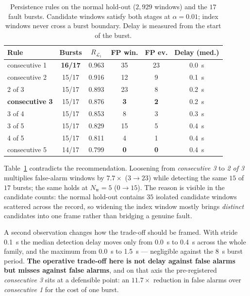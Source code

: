 \documentclass{article}
\begin{document}
\begin{table}[t]
\centering\small
\caption{Persistence rules on the normal hold-out ($2{,}929$ windows) and the
$17$ fault bursts. Candidate windows satisfy both stages at $\alpha=0.01$;
index windows never cross a burst boundary. Delay is measured from the start of
the burst.}
\label{tab:mofn}
\begin{tabular}{lccccc}
\toprule
Rule & Bursts & $R_{\mathcal{L}_1}$ & FP win. & FP ev. & Delay (med.) \\
\midrule
consecutive 1 & \textbf{16/17} & 0.963 & 35 & 23 & \SI{0.0}{\second} \\
consecutive 2 & 15/17 & 0.916 & 12 & 9 & \SI{0.1}{\second} \\
2 of 3        & 15/17 & 0.893 & 23 & 8 & \SI{0.2}{\second} \\
\textbf{consecutive 3} & 15/17 & 0.876 & \textbf{3} & \textbf{2} & \SI{0.2}{\second} \\
3 of 4        & 15/17 & 0.853 & 8  & 3 & \SI{0.3}{\second} \\
3 of 5        & 15/17 & 0.829 & 15 & 5 & \SI{0.4}{\second} \\
4 of 5        & 15/17 & 0.811 & 4  & 1 & \SI{0.4}{\second} \\
consecutive 5 & 14/17 & 0.799 & \textbf{0} & \textbf{0} & \SI{0.4}{\second} \\
\bottomrule
\end{tabular}
\end{table}

Table~\ref{tab:mofn} contradicts the recommendation. Loosening from
\emph{consecutive 3} to \emph{2 of 3} multiplies false-alarm windows by
$7.7\times$ ($3\to23$) while detecting the same $15$ of $17$ bursts; the same
holds at $N_{\mathrm w}=5$ ($0\to15$). The reason is visible in the candidate
counts: the normal hold-out contains $35$ isolated candidate windows scattered
across the record, so widening the index window mostly brings \emph{distinct}
candidates into one frame rather than bridging a genuine fault.

A second observation changes how the trade-off should be framed. With stride
\SI{0.1}{\second} the median detection delay moves only from \SI{0.0}{\second}
to \SI{0.4}{\second} across the whole family, and the maximum from
\SI{0.0}{\second} to \SI{1.5}{\second} --- negligible against the
\SI{8}{\second} burst period. \textbf{The operative trade-off here is not delay
against false alarms but misses against false alarms}, and on that axis the
pre-registered \emph{consecutive 3} sits at a defensible point: an
$11.7\times$ reduction in false alarms over \emph{consecutive 1} for the cost
of one burst.
\end{document}
